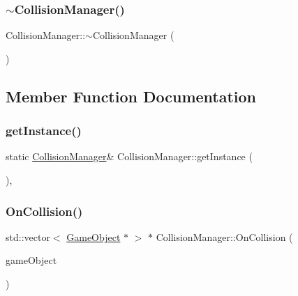 \subsubsection{\texorpdfstring{$\sim$\+Collision\+Manager()}{~CollisionManager()}}
{\footnotesize\ttfamily Collision\+Manager\+::$\sim$\+Collision\+Manager (\begin{DoxyParamCaption}{ }\end{DoxyParamCaption})}



\subsection{Member Function Documentation}
\mbox{\label{class_collision_manager_af7ae5c9cd14ffea044059e17225d3d1c}} 
\subsubsection{\texorpdfstring{get\+Instance()}{getInstance()}}
{\footnotesize\ttfamily static \mbox{\hyperlink{class_collision_manager}{Collision\+Manager}}\& Collision\+Manager\+::get\+Instance (\begin{DoxyParamCaption}{ }\end{DoxyParamCaption})\hspace{0.3cm}{\ttfamily [inline]}, {\ttfamily [static]}}

\mbox{\label{class_collision_manager_aa36e8b56d10fc36677a8a9bb76891c58}} 
\subsubsection{\texorpdfstring{On\+Collision()}{OnCollision()}}
{\footnotesize\ttfamily std\+::vector$<$ \mbox{\hyperlink{class_game_object}{Game\+Object}} $\ast$ $>$ $\ast$ Collision\+Manager\+::\+On\+Collision (\begin{DoxyParamCaption}\item[{\mbox{\hyperlink{class_game_object}{Game\+Object}} $\ast$}]{game\+Object }\end{DoxyParamCaption})}



